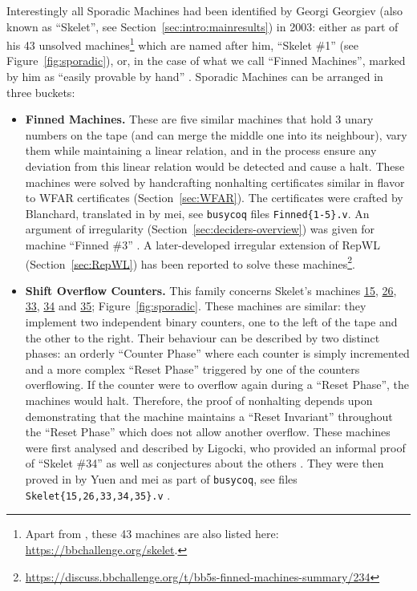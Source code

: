 Interestingly all Sporadic Machines had been identified by Georgi Georgiev (also known as ``Skelet'', see Section~\ref{sec:intro:mainresults}) in 2003: either as part of his 43 unsolved machines\footnote{Apart from \cite{Skelet_bbfind_list}, these 43 machines are also listed here: \url{https://bbchallenge.org/skelet}.} which are named after him, \eg ``Skelet \#1'' (see Figure~\ref{fig:sporadic}), or, in the case of what we call ``Finned Machines'', marked by him as ``easily provable by hand'' \cite{Skelet_bbfind_list}. Sporadic Machines can be arranged in three buckets:
\begin{itemize}
    \item \textbf{Finned Machines.} These are five similar machines that hold 3 unary numbers on the tape (and can merge the middle one into its neighbour), vary them while maintaining a linear relation, and in the process ensure any deviation from this linear relation would be detected and cause a halt. These machines were solved by handcrafting nonhalting certificates similar in flavor to WFAR certificates (Section~\ref{sec:WFAR}). The certificates were crafted by Blanchard, translated in \Coq by mei, see \texttt{busycoq} files \texttt{Finned\{1-5\}.v}. An argument of irregularity (Section~\ref{sec:deciders-overview}) was given for machine ``Finned \#3'' \cite{irregularFinned3}. A later-developed irregular extension of RepWL (Section~\ref{sec:RepWL}) has been reported to solve these machines\footnote{\url{https://discuss.bbchallenge.org/t/bb5s-finned-machines-summary/234}}.
    \item \textbf{Shift Overflow Counters.} This family concerns Skelet's machines \href{https://bbchallenge.org/1RB---_1RC1LB_1LD1RE_1LB0LD_1RA0RC}{15}, \href{https://bbchallenge.org/1RB1LD_1RC0RB_1LA1RC_1LE0LA_1LC---}{26}, \href{https://bbchallenge.org/1RB1LC_0RC0RB_1LD0LA_1LE---_1LA1RE}{33}, \href{https://bbchallenge.org/1RB1LC_0RC0RB_1LD0LA_1LE---_1LA1RA}{34} and \href{https://bbchallenge.org/1RB1LC_0RC0RB_1LD0LA_1LE---_1LA0LA}{35}; Figure~\ref{fig:sporadic}. These machines are similar: they implement two independent binary counters, one to the left of the tape and the other to the right. Their behaviour can be described by two distinct phases: an orderly ``Counter Phase'' where each counter is simply incremented and a more complex ``Reset Phase'' triggered by one of the counters overflowing. If the counter were to overflow again during a ``Reset Phase'', the machines would halt. Therefore, the proof of nonhalting depends upon demonstrating that the machine maintains a ``Reset Invariant'' throughout the ``Reset Phase'' which does not allow another overflow. These machines were first analysed and described by Ligocki, who provided an informal proof of ``Skelet \#34'' as well as conjectures about the others \cite{ShawnSOC}. They were then proved in \Coq by Yuen and mei as part of \texttt{busycoq}, see files \texttt{Skelet\{15,26,33,34,35\}.v} \cite{busycoq}.

\end{itemize}
